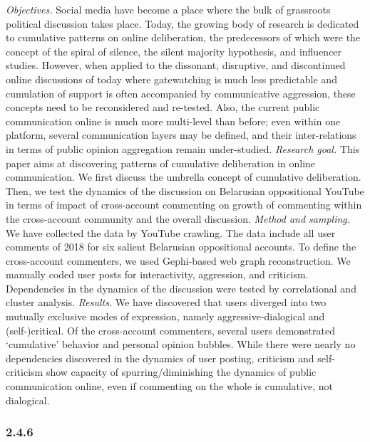 \textit{Objectives.} Social media have become a place where the bulk of grassroots political discussion takes place. Today, the growing body of research is dedicated to cumulative patterns on online deliberation, the predecessors of which were the concept of the spiral of silence, the silent majority hypothesis, and influencer studies. However, when applied to the dissonant, disruptive, and discontinued online discussions of today where gatewatching is much less predictable and cumulation of support is often accompanied by communicative aggression, these concepts need to be reconsidered and re-tested. Also, the current public communication online is much more multi-level than before; even within one platform, several communication layers may be defined, and their inter-relations in terms of public opinion aggregation remain under-studied. \textit{Research goal.} This paper aims at discovering patterns of cumulative deliberation in online communication. We first discuss the umbrella concept of cumulative deliberation. Then, we test the dynamics of the discussion on Belarusian oppositional YouTube in terms of impact of cross-account commenting on growth of commenting within the cross-account community and the overall discussion. \textit{Method and sampling.} We have collected the data by YouTube crawling. The data include all user comments of 2018 for six salient Belarusian oppositional accounts. To define the cross-account commenters, we used Gephi-based web graph reconstruction. We manually coded user posts for interactivity, aggression, and criticism. Dependencies in the dynamics of the discussion were tested by correlational and cluster analysis. \textit{Results.} We have discovered that users diverged into two mutually exclusive modes of expression, namely aggressive-dialogical and (self-)critical. Of the cross-account commenters, several users demonstrated ‘cumulative’ behavior and personal opinion bubbles. While there were nearly no dependencies discovered in the dynamics of user posting, criticism and self-criticism show capacity of spurring/diminishing the dynamics of public communication online, even if commenting on the whole is cumulative, not dialogical.

\subsubsection{2.4.6}

